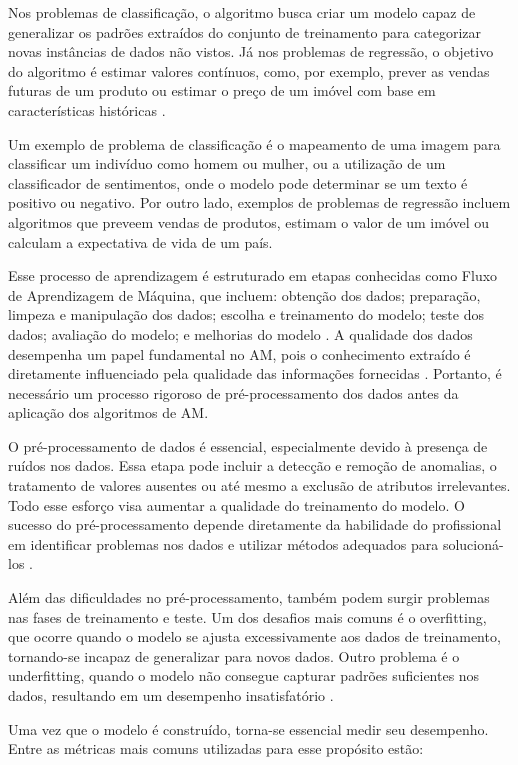 Nos problemas de classificação, o algoritmo busca criar um modelo capaz de generalizar os padrões extraídos do conjunto de treinamento para categorizar novas instâncias de dados não vistos. Já nos problemas de regressão, o objetivo do algoritmo é estimar valores contínuos, como, por exemplo, prever as vendas futuras de um produto ou estimar o preço de um imóvel com base em características históricas \cite{guimaraes2019}.

Um exemplo de problema de classificação é o mapeamento de uma imagem para classificar um indivíduo como homem ou mulher, ou a utilização de um classificador de sentimentos, onde o modelo pode determinar se um texto é positivo ou negativo. Por outro lado, exemplos de problemas de regressão incluem algoritmos que preveem vendas de produtos, estimam o valor de um imóvel ou calculam a expectativa de vida de um país.

Esse processo de aprendizagem é estruturado em etapas conhecidas como Fluxo de Aprendizagem de Máquina, que incluem: obtenção dos dados; preparação, limpeza e manipulação dos dados; escolha e treinamento do modelo; teste dos dados; avaliação do modelo; e melhorias do modelo \cite{tan2006}. A qualidade dos dados desempenha um papel fundamental no AM, pois o conhecimento extraído é diretamente influenciado pela qualidade das informações fornecidas \cite{guimaraes2019}. Portanto, é necessário um processo rigoroso de pré-processamento dos dados antes da aplicação dos algoritmos de AM.

O pré-processamento de dados é essencial, especialmente devido à presença de ruídos nos dados. Essa etapa pode incluir a detecção e remoção de anomalias, o tratamento de valores ausentes ou até mesmo a exclusão de atributos irrelevantes. Todo esse esforço visa aumentar a qualidade do treinamento do modelo. O sucesso do pré-processamento depende diretamente da habilidade do profissional em identificar problemas nos dados e utilizar métodos adequados para solucioná-los \cite{neves2003}.

Além das dificuldades no pré-processamento, também podem surgir problemas nas fases de treinamento e teste. Um dos desafios mais comuns é o overfitting, que ocorre quando o modelo se ajusta excessivamente aos dados de treinamento, tornando-se incapaz de generalizar para novos dados. Outro problema é o underfitting, quando o modelo não consegue capturar padrões suficientes nos dados, resultando em um desempenho insatisfatório \cite{russel2010}.

Uma vez que o modelo é construído, torna-se essencial medir seu desempenho. Entre as métricas mais comuns utilizadas para esse propósito estão:

